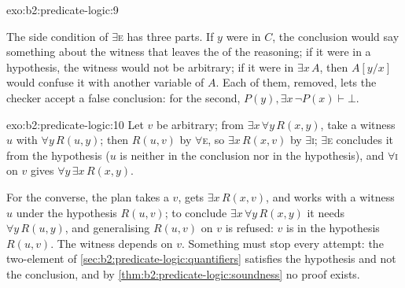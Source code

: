 \begin{solution}{exo:b2:predicate-logic:9}

The side condition of $\exists$\textsc{e} has three parts. If $y$ were  in $C$, the conclusion would say something
about the witness that leaves the  of the reasoning; if it were  in a hypothesis, the witness would not be
arbitrary; if it were  in $\exists x\, A$, then $A[y/x]$ would confuse it with another variable of $A$. Each of
them, removed, lets the checker accept a false conclusion: for the second, $P(y), \exists x\, \neg P(x) \vdash \bot$.
\end{solution}

\begin{solution}{exo:b2:predicate-logic:10}
Let $v$ be arbitrary; from $\exists x\, \forall y\, R(x, y)$, take a witness $u$ with $\forall y\, R(u, y)$; then $R(u,
v)$ by $\forall$\textsc{e}, so $\exists x\, R(x, v)$ by $\exists$\textsc{i}; $\exists$\textsc{e} concludes it from the
hypothesis ($u$ is  neither in the conclusion nor in the hypothesis), and $\forall$\textsc{i} on $v$ gives
$\forall y\, \exists x\, R(x, y)$.


\label{out:b2:predicate-logic:exo-proofs}

For the converse, the plan takes a $v$, gets $\exists x\, R(x, v)$, and works with a witness $u$ under the hypothesis
$R(u, v)$; to conclude $\exists x\, \forall y\, R(x, y)$ it needs $\forall y\, R(u, y)$, and generalising $R(u, v)$ on
$v$ is refused: $v$ is  in the hypothesis $R(u, v)$. The witness depends on $v$. Something must stop every attempt:
the two-element  of \cref{sec:b2:predicate-logic:quantifiers} satisfies the hypothesis and not the conclusion,
and by \cref{thm:b2:predicate-logic:soundness} no proof exists.
\end{solution}

